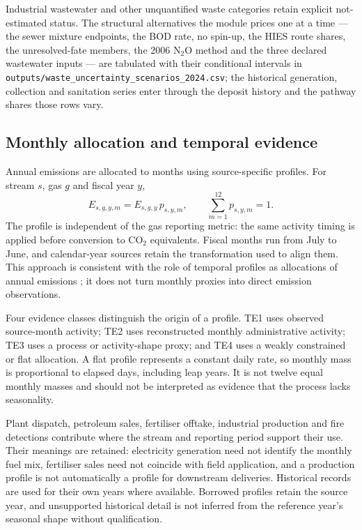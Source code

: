 \documentclass[essd]{copernicus}
\begin{document}
Industrial wastewater and other unquantified waste categories retain explicit not-estimated status. The structural alternatives the module prices one at a time --- the sewer mixture endpoints, the BOD rate, no spin-up, the HIES route shares, the unresolved-fate members, the 2006 N$_2$O method and the three declared wastewater inputs --- are tabulated with their conditional intervals in \texttt{outputs/waste\_uncertainty\_scenarios\_2024.csv}; the historical generation, collection and sanitation series enter through the deposit history and the pathway shares those rows vary.


\subsection{Monthly allocation and temporal evidence}
\label{sec:temporal}

Annual emissions are allocated to months using source-specific profiles. For stream $s$, gas $g$ and fiscal year $y$,
\begin{equation}
 E_{s,g,y,m}=E_{s,g,y}\,p_{s,y,m},\qquad
 \sum_{m=1}^{12}p_{s,y,m}=1.
 \label{eq:monthly}
\end{equation}
The profile is independent of the gas reporting metric: the same activity timing is applied before conversion to CO$_2$ equivalents. Fiscal months run from July to June, and calendar-year sources retain the transformation used to align them. This approach is consistent with the role of temporal profiles as allocations of annual emissions \citep{Crippa2020}; it does not turn monthly proxies into direct emission observations.

Four evidence classes distinguish the origin of a profile. TE1 uses observed source-month activity; TE2 uses reconstructed monthly administrative activity; TE3 uses a process or activity-shape proxy; and TE4 uses a weakly constrained or flat allocation. A flat profile represents a constant daily rate, so monthly mass is proportional to elapsed days, including leap years. It is not twelve equal monthly masses and should not be interpreted as evidence that the process lacks seasonality.

Plant dispatch, petroleum sales, fertiliser offtake, industrial production and fire detections contribute where the stream and reporting period support their use. Their meanings are retained: electricity generation need not identify the monthly fuel mix, fertiliser sales need not coincide with field application, and a production profile is not automatically a profile for downstream deliveries. Historical records are used for their own years where available. Borrowed profiles retain the source year, and unsupported historical detail is not inferred from the reference year's seasonal shape without qualification.
\end{document}
